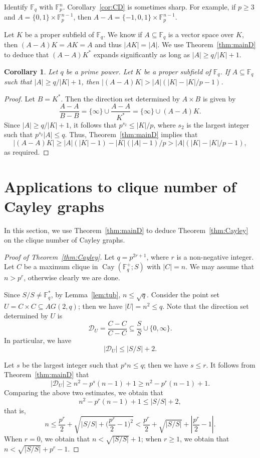 \documentclass[12pt,reqno]{amsart}
\newtheorem{cor}[thm]{Corollary}
\theoremstyle{definition}
\newcommand{\F}{\mathbb{F}}
\begin{document}
Identify $\F_q$ with $\F_p^{n}$. Corollary~\ref{cor:CD} is sometimes sharp. For example, if $p\geq 3$ and $A=\{0,1\} \times \F_p^{n-1}$, then $A-A=\{-1,0,1\} \times \F_p^{n-1}$. 

Let $K$ be a proper subfield of $\F_q$. We know if $A \subseteq \F_q$ is a vector space over $K$, then $(A-A)K=AK=A$ and thus $|AK|=|A|$. We use Theorem~\ref{thm:mainD} to deduce that $(A-A)K^*$ expands significantly as long as $|A| \geq q/|K|+1$. 

\begin{cor}
Let $q$ be a prime power. Let $K$ be a proper subfield of $\F_q$. If $A \subseteq \F_q$ such that $|A|\geq q/|K|+1$, then $|(A-A)K|>|A|(|K|-|K|/p-1)$.
\end{cor}

\begin{proof}
Let $B=K^*$. Then the direction set determined by $A \times B$ is given by $$\frac{A-A}{B-B}=\{\infty\} \cup\frac{A-A}{K^*}=\{\infty\} \cup(A-A)K.$$ Since $|A|\geq q/|K|+1$, it follows that $p^{s_2}\leq|K|/p$, where $s_2$ is the largest integer such that $p^{s_2}|A|\leq q$. Thus, Theorem~\ref{thm:mainD} implies that  
$$
|(A-A)K| \geq |A|(|K|-1)-|K|(|A|-1)/p>|A|(|K|-|K|/p-1),
$$ 
as required.
\end{proof}

\section{Applications to clique number of Cayley graphs}\label{sec:app}

In this section, we use Theorem~\ref{thm:mainD} to deduce Theorem~\ref{thm:Cayley} on the clique number of Cayley graphs.

\begin{proof}[Proof of Theorem~\ref{thm:Cayley}]
Let $q=p^{2r+1}$, where $r$ is a non-negative integer. Let $C$ be a maximum clique in $\operatorname{Cay}(\F_q^+;S)$ with $|C|=n$. We may assume that $n>p^{r}$, otherwise clearly we are done. 

Since $S/S \neq \F_q^*$, by Lemma~\ref{lem:tub}, $n \leq \sqrt{q}$. Consider the point set $U=C \times C \subseteq AG(2,q)$; then we have $|U|=n^2\leq q$. Note that the direction set determined by $U$ is
$$\mathcal{D}_U=\frac{C-C}{C-C} \subseteq \frac{S}{S} \cup \{0,\infty\}.$$
In particular, we have 
$$|\mathcal{D}_U|\leq |S/S|+2.$$ 

Let $s$ be the largest integer such that $p^sn \leq q$; then we have $s \leq r$. It follows from Theorem~\ref{thm:mainD} that 
$$
|\mathcal{D}_U| \geq n^2-p^s(n-1)+1 \geq n^2-p^r(n-1)+1.
$$
Comparing the above two estimates, we obtain that
$$
n^2-p^r(n-1)+1 \leq |S/S|+2,
$$
that is,
$$
n \leq \frac{p^r}{2}+\sqrt{|S/S|+\bigg(\frac{p^r}{2}-1\bigg)^2} < \frac{p^r}{2}+\sqrt{|S/S|}+\left|\frac{p^r}{2}-1\right|.
$$
When $r=0$, we obtain that $n<\sqrt{|S/S|}+1$; when $r \geq 1$, we obtain that $n<\sqrt{|S/S|}+p^r-1$. 
\end{proof}
\end{document}
